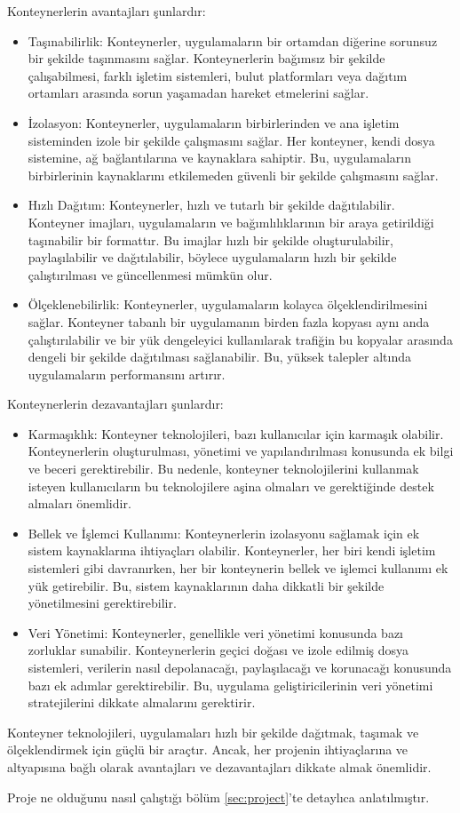 Konteynerlerin avantajları şunlardır:
\begin{itemize}
  \item Taşınabilirlik: Konteynerler, uygulamaların bir ortamdan diğerine sorunsuz bir şekilde taşınmasını sağlar. Konteynerlerin bağımsız bir şekilde çalışabilmesi, farklı işletim sistemleri, bulut platformları veya dağıtım ortamları arasında sorun yaşamadan hareket etmelerini sağlar.
  \item İzolasyon: Konteynerler, uygulamaların birbirlerinden ve ana işletim sisteminden izole bir şekilde çalışmasını sağlar. Her konteyner, kendi dosya sistemine, ağ bağlantılarına ve kaynaklara sahiptir. Bu, uygulamaların birbirlerinin kaynaklarını etkilemeden güvenli bir şekilde çalışmasını sağlar.
  \item Hızlı Dağıtım: Konteynerler, hızlı ve tutarlı bir şekilde dağıtılabilir. Konteyner imajları, uygulamaların ve bağımlılıklarının bir araya getirildiği taşınabilir bir formattır. Bu imajlar hızlı bir şekilde oluşturulabilir, paylaşılabilir ve dağıtılabilir, böylece uygulamaların hızlı bir şekilde çalıştırılması ve güncellenmesi mümkün olur.
  \item Ölçeklenebilirlik: Konteynerler, uygulamaların kolayca ölçeklendirilmesini sağlar. Konteyner tabanlı bir uygulamanın birden fazla kopyası aynı anda çalıştırılabilir ve bir yük dengeleyici kullanılarak trafiğin bu kopyalar arasında dengeli bir şekilde dağıtılması sağlanabilir. Bu, yüksek talepler altında uygulamaların performansını artırır.
\end{itemize}

Konteynerlerin dezavantajları şunlardır:
\begin{itemize}
  \item Karmaşıklık: Konteyner teknolojileri, bazı kullanıcılar için karmaşık olabilir. Konteynerlerin oluşturulması, yönetimi ve yapılandırılması konusunda ek bilgi ve beceri gerektirebilir. Bu nedenle, konteyner teknolojilerini kullanmak isteyen kullanıcıların bu teknolojilere aşina olmaları ve gerektiğinde destek almaları önemlidir.
  \item Bellek ve İşlemci Kullanımı: Konteynerlerin izolasyonu sağlamak için ek sistem kaynaklarına ihtiyaçları olabilir. Konteynerler, her biri kendi işletim sistemleri gibi davranırken, her bir konteynerin bellek ve işlemci kullanımı ek yük getirebilir. Bu, sistem kaynaklarının daha dikkatli bir şekilde yönetilmesini gerektirebilir.
  \item Veri Yönetimi: Konteynerler, genellikle veri yönetimi konusunda bazı zorluklar sunabilir. Konteynerlerin geçici doğası ve izole edilmiş dosya sistemleri, verilerin nasıl depolanacağı, paylaşılacağı ve korunacağı konusunda bazı ek adımlar gerektirebilir. Bu, uygulama geliştiricilerinin veri yönetimi stratejilerini dikkate almalarını gerektirir.
\end{itemize}

Konteyner teknolojileri, uygulamaları hızlı bir şekilde dağıtmak, taşımak ve ölçeklendirmek için güçlü bir araçtır. Ancak, her projenin ihtiyaçlarına ve altyapısına bağlı olarak avantajları ve dezavantajları dikkate almak önemlidir.

Proje ne olduğunu nasıl çalıştığı bölüm \ref{sec:project}'te detaylıca anlatılmıştır.